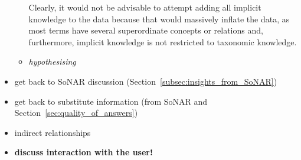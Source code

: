 \begin{itemize}
\begin{itemize}
        Clearly, it would not be advisable to attempt adding all implicit knowledge to the data
        because that would massively inflate the data,
        as most terms have several superordinate concepts or relations and,
        furthermore, implicit knowledge is not restricted to taxonomic knowledge.
      \item
        \emph{hypothesising}
    \end{itemize}
  \item
    get back to SoNAR discussion (Section~\ref{subsec:insights_from_SoNAR})
  \item
    get back to substitute information (from SoNAR and Section~\ref{sec:quality_of_answers})
  \item
    indirect relationships
  \item
    \textbf{discuss interaction with the user!}
\end{itemize}
